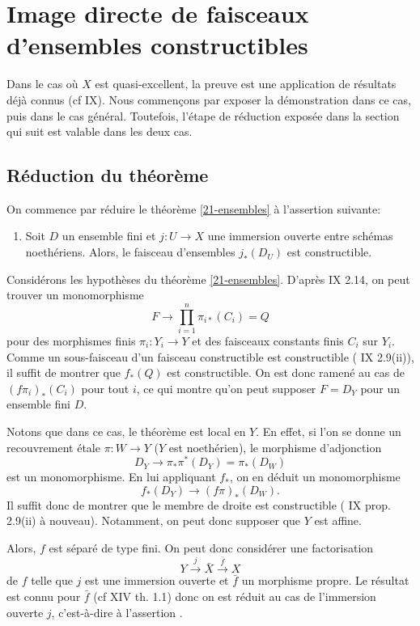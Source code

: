 \documentclass[10pt]{../fichiers-configuration-latex/smfart}
\begin{document}
\section{Image directe de faisceaux d'ensembles constructibles}
\label{21-sec-ensembles}

Dans le cas où $X$ est quasi-excellent,
la preuve est une application de résultats déjà connus
 (cf  {IX}). 
Nous commençons par exposer la démonstration dans ce
cas, puis dans le cas général. 
Toutefois, l'étape de réduction exposée dans la section qui suit
est valable dans les deux cas.

\subsection{Réduction du théorème}

On commence par réduire le théorème \ref{21-ensembles} à l'assertion suivante:
\begin{enumerate}
\item[\ppE]
Soit $D$ un ensemble fini et
$j:U \rightarrow X$ une immersion ouverte entre schémas noethériens.
Alors, le faisceau d'ensembles $j_*(D_U)$ est constructible.
\end{enumerate}
Considérons les hypothèses du théorème \ref{21-ensembles}.
D'après  {IX} {2.14}, on peut trouver un monomorphisme
$$
F \rightarrow \prod_{i=1}^n \pi_{i*}(C_i)=Q
$$
pour des morphismes finis $\pi_i:Y_i \rightarrow Y$ et 
 des faisceaux constants finis $C_i$ sur $Y_i$.
Comme un sous-faisceau d'un faisceau constructible est constructible
( {IX} {2.9(ii)}),
il suffit de montrer que $f_*(Q)$ est constructible.
On est donc ramené au cas de $(f\pi_i)_*(C_i)$ pour tout $i$,
ce qui montre qu'on peut supposer $F=D_Y$ pour
un ensemble fini $D$.

Notons que dans ce cas, le théorème est local en $Y$.
En effet, si l'on se donne un recouvrement étale
$ \pi:W \rightarrow Y$ ($Y$ est noethérien),
 le morphisme d'adjonction 
$$
D_Y \rightarrow \pi_*\pi^*(D_Y)=\pi_*(D_W)
$$ 
est un monomorphisme. En lui appliquant $f_*$,
 on en déduit un monomorphisme
$$
f_*(D_Y) \rightarrow (f \pi)_*(D_W).
$$
Il suffit donc de montrer que le membre de droite est 
constructible ( {IX} {prop. 2.9(ii)} à nouveau).
Notamment, on peut donc supposer que $Y$ est affine.

Alors, $f$ est séparé de type fini. 
On peut donc considérer une factorisation
$$
Y \xrightarrow j \bar X \xrightarrow{\bar f} X
$$
de $f$ telle que $j$ est une immersion ouverte et $\bar f$
un morphisme propre. Le résultat est connu pour $\bar f$ 
(cf  {XIV} {th. 1.1}) donc on est réduit au cas 
de l'immersion ouverte $j$, c'est-à-dire à l'assertion
\ppE.
\end{document}
